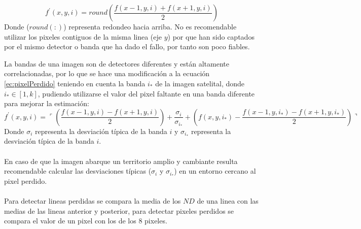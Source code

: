 		\begin{equation}\label{ec:pixelPerdido}
		f^{'}(x,y,i) =  round(\dfrac{f(x-1,y,i) + f(x+1,y,i)}{2})
		\end{equation} 
Donde ($ round(:) $) representa redondeo hacia arriba. No es recomendable utilizar los pixeles contiguos de la misma linea (eje $ y $) por que han sido captados por el mismo detector o banda que ha dado el fallo, por tanto son poco fiables.

La bandas de una imagen son de detectores diferentes y est\'an altamente correlacionadas, por lo que se hace una modificaci\'on a la ecuaci\'on \ref{ec:pixelPerdido} teniendo en cuenta la banda $ i_{*} $ de la imagen satelital, donde $ i_{*} \in [1,k] $, pudiendo utilizarse el valor del pixel faltante en una banda diferente para mejorar la estimaci\'on:
		\begin{equation}
		f^{'}(x,y,i) = \ulcorner (\dfrac{f(x-1,y,i)-f(x+1,y,i)}{2})+ \dfrac{\sigma_{i}}{\sigma_{i_{*}}} +(f(x,y,i_{*})-\dfrac{f(x-1,y,i_{*})-f(x+1,y,i_{*})}{2}) \urcorner
		\end{equation} 
Donde $ \sigma_{i} $ representa la desviaci\'on t\'ipica de la banda $ i $ y $ \sigma_{i_{*}} $ representa la desviaci\'on t\'ipica de la banda $ i $.\\~\\
En caso de que la imagen abarque un territorio amplio y cambiante resulta recomendable calcular las desviaciones t\'ipicas ($ \sigma_{i} $ y $ \sigma_{i_{*}} $) en un entorno cercano al pixel perdido.\\~\\
Para detectar lineas perdidas se compara la media de los $ ND $ de una linea con las medias de las lineas anterior y posterior, para detectar pixeles perdidos se compara el valor de un pixel con los de los 8 pixeles.
